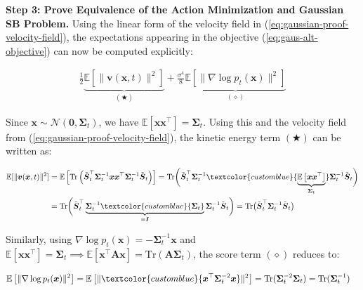 \documentclass{article}
\newcommand{\bluetext}[1]{\textcolor{customblue}{#1}}
\begin{document}
\textbf{Step 3: Prove Equivalence of the Action Minimization and Gaussian SB Problem. }
Using the linear form of the velocity field in (\ref{eq:gaussian-proof-velocity-field}), the expectations appearing in the objective (\ref{eq:gaus-alt-objective}) can now be computed explicitly:
\begin{small}
\begin{align}
    \frac{1}{2}\underbrace{\mathbb{E}[\|\boldsymbol{v}(\boldsymbol{x},t)\|^2]}_{(\bigstar)}+\frac{\sigma^4}{8}\underbrace{\mathbb{E}[\|\nabla\log p_t(\boldsymbol{x})\|^2]}_{(\diamond)}\label{eq:gaus-proof-eq1}
\end{align}
\end{small}
Since $\boldsymbol{x}\sim \mathcal{N}(\boldsymbol{0},\boldsymbol{\Sigma}_t)$, we have $\mathbb{E}[\boldsymbol{x}\boldsymbol{x}^\top ] =\boldsymbol{\Sigma}_t$. Using this and the velocity field from (\ref{eq:gaussian-proof-velocity-field}), the kinetic energy term $(\bigstar)$ can be written as:
\begin{small}
\begin{align}
    \mathbb{E}[\|\boldsymbol{v}(\boldsymbol{x},t)\|^2]&=\mathbb{E}\left[\text{Tr}\left(\tilde{\boldsymbol{S}}^\top_t\boldsymbol{\Sigma}^{-1}_t\boldsymbol{x}\boldsymbol{x}^\top\boldsymbol{\Sigma}^{-1}_t\tilde{\boldsymbol{S}}_t\right)\right]=\text{Tr}\bigg(\tilde{\boldsymbol{S}}^\top_t\boldsymbol{\Sigma}^{-1}_t\bluetext{\underbrace{\mathbb{E}\left[\boldsymbol{x}\boldsymbol{x}^\top\right]}_{\boldsymbol{\Sigma}_t}}\boldsymbol{\Sigma}^{-1}_t\tilde{\boldsymbol{S}}_t\bigg)\nonumber\\
    &=\text{Tr}\bigg(\tilde{\boldsymbol{S}}^\top_t\underbrace{\boldsymbol{\Sigma}^{-1}_t\bluetext{\boldsymbol{\Sigma}_t}}_{=\boldsymbol{I}}\boldsymbol{\Sigma}^{-1}_t\tilde{\boldsymbol{S}}_t\bigg) = \text{Tr}\big(\tilde{\boldsymbol{S}}^\top_t\boldsymbol{\Sigma}^{-1}_t\tilde{\boldsymbol{S}}_t\big)
\end{align}
\end{small}
Similarly, using $\nabla \log p_t(\boldsymbol{x})=-\boldsymbol{\Sigma}_t^{-1}\boldsymbol{x}$ and $\mathbb{E}[\boldsymbol{x}\boldsymbol{x}^\top ] =\boldsymbol{\Sigma}_t\implies \mathbb{E}[\boldsymbol{x}^\top \boldsymbol{A}\boldsymbol{x} ] =\text{Tr}(\boldsymbol{A}\boldsymbol{\Sigma}_t)$, the score term $(\diamond)$ reduces to:
\begin{small}
\begin{align}
    \mathbb{E}\left[\|\nabla\log p_t(\boldsymbol{x}) \|^2\right]&=\mathbb{E}\left[\|\bluetext{\boldsymbol{x}^\top\boldsymbol{\Sigma}_t^{-2}\boldsymbol{x}}\|^2\right]=\text{Tr}(\boldsymbol{\Sigma}_t^{-2}\boldsymbol{\Sigma}_t)=\text{Tr}(\boldsymbol{\Sigma}_t^{-1})
\end{align}
\end{small}
\end{document}
